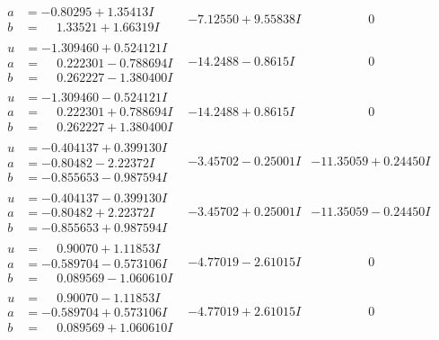 \documentclass[1p]{elsarticle_modified}
\theoremstyle{definition}
\begin{document}
$$\begin{array}{c|c|c}
\begin{aligned}
a &= -0.80295 + 1.35413 I \\
b &= \phantom{-}1.33521 + 1.66319 I\end{aligned}
 & -7.12550 + 9.55838 I & \phantom{-0.000000 } 0 \\ \hline\begin{aligned}
u &= -1.309460 + 0.524121 I \\
a &= \phantom{-}0.222301 - 0.788694 I \\
b &= \phantom{-}0.262227 - 1.380400 I\end{aligned}
 & -14.2488 - 0.8615 I & \phantom{-0.000000 } 0 \\ \hline\begin{aligned}
u &= -1.309460 - 0.524121 I \\
a &= \phantom{-}0.222301 + 0.788694 I \\
b &= \phantom{-}0.262227 + 1.380400 I\end{aligned}
 & -14.2488 + 0.8615 I & \phantom{-0.000000 } 0 \\ \hline\begin{aligned}
u &= -0.404137 + 0.399130 I \\
a &= -0.80482 - 2.22372 I \\
b &= -0.855653 - 0.987594 I\end{aligned}
 & -3.45702 - 0.25001 I & -11.35059 + 0.24450 I \\ \hline\begin{aligned}
u &= -0.404137 - 0.399130 I \\
a &= -0.80482 + 2.22372 I \\
b &= -0.855653 + 0.987594 I\end{aligned}
 & -3.45702 + 0.25001 I & -11.35059 - 0.24450 I \\ \hline\begin{aligned}
u &= \phantom{-}0.90070 + 1.11853 I \\
a &= -0.589704 - 0.573106 I \\
b &= \phantom{-}0.089569 - 1.060610 I\end{aligned}
 & -4.77019 - 2.61015 I & \phantom{-0.000000 } 0 \\ \hline\begin{aligned}
u &= \phantom{-}0.90070 - 1.11853 I \\
a &= -0.589704 + 0.573106 I \\
b &= \phantom{-}0.089569 + 1.060610 I\end{aligned}
 & -4.77019 + 2.61015 I & \phantom{-0.000000 } 0 \\ \hline\begin{aligned}

\end{aligned}
\end{array}$$
\end{document}
